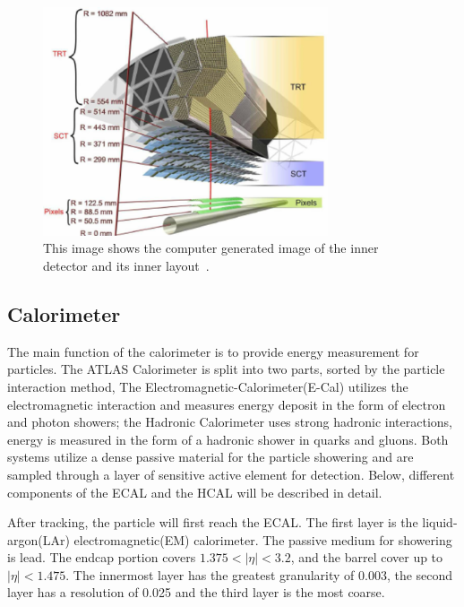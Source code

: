 \begin{figure}[!htb]
    \begin{center}
        \includegraphics[width=0.75\textwidth]{figures/chapter_ATLAS/InnerDetector2}
        \caption{
            This image shows the computer generated image of the inner detector and its inner layout~\cite{Pequenao:1095926}.
        }
        \label{fig:InnerDetector2}
    \end{center}
\end{figure}

\subsection{Calorimeter}
The main function of the calorimeter is to provide energy measurement for particles. The ATLAS Calorimeter is split into two parts, sorted by the particle interaction method, The Electromagnetic-Calorimeter(E-Cal) utilizes the electromagnetic interaction and measures energy deposit in the form of electron and photon showers; the Hadronic Calorimeter uses strong hadronic interactions, energy is measured in the form of a hadronic shower in quarks and gluons. Both systems utilize a dense passive material for the particle showering and are sampled through a layer of sensitive active element for detection. Below, different components of the ECAL and the HCAL will be described in detail. 

After tracking, the particle will first reach the ECAL. The first layer is the liquid-argon(LAr) electromagnetic(EM) calorimeter. The passive medium for showering is lead. The endcap portion covers $1.375< |\eta| < 3.2$, and the barrel cover up to $|\eta|<1.475$. The innermost layer has the greatest granularity of 0.003, the second layer has a resolution of 0.025 and the third layer is the most coarse. 

